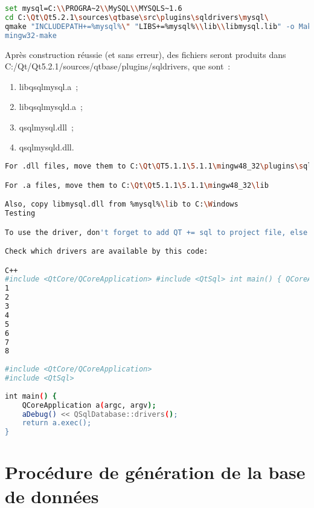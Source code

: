 
\begin{lstlisting}[language=Bash, escapechar=$]
set mysql=C:\\PROGRA~2\\MySQL\\MYSQLS~1.6
cd C:\Qt\Qt5.2.1\sources\qtbase\src\plugins\sqldrivers\mysql\
qmake "INCLUDEPATH+=%mysql%\" "LIBS+=%mysql%\\lib\\libmysql.lib" -o Makefile mysql.pro
mingw32-make
\end{lstlisting}
Après construction réussie (et sans erreur), des fichiers seront produits dans \\ C:/Qt/Qt5.2.1/sources/qtbase/plugins/sqldrivers, que sont~:
\begin{enumerate}
	\item libqsqlmysql.a~;
	\item libqsqlmysqld.a~;
	\item qsqlmysql.dll~;
	\item qsqlmysqld.dll.
\end{enumerate}
\begin{lstlisting}[language=Bash, escapechar=$]
For .dll files, move them to C:\Qt\QT5.1.1\5.1.1\mingw48_32\plugins\sqldrivers.

For .a files, move them to C:\Qt\Qt5.1.1\5.1.1\mingw48_32\lib

Also, copy libmysql.dll from %mysql%\lib to C:\Windows
Testing

To use the driver, don't forget to add QT += sql to project file, else it don't work.

Check which drivers are available by this code:

C++
#include <QtCore/QCoreApplication> #include <QtSql> int main() { QCoreApplication a(argc, argv); aDebug() << QSqlDatabase::drivers(); return a.exec(); }
1
2
3
4
5
6
7
8
	
#include <QtCore/QCoreApplication>
#include <QtSql>
 
int main() {
    QCoreApplication a(argc, argv);
    aDebug() << QSqlDatabase::drivers();
    return a.exec();
}

\end{lstlisting}

 \section{Procédure de génération de la base de données}
 

